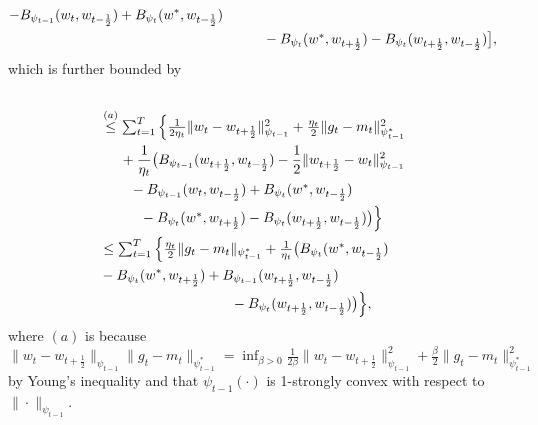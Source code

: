 \documentclass[11pt]{article}
\makeatletter
\renewenvironment{proof}[1][\proofname]{%
   \par\pushQED{\qed}\normalfont%
   \topsep6\p@\@plus6\p@\relax
   \trivlist\item[\hskip\labelsep\bfseries#1]%
   \ignorespaces
}{%
   \popQED\endtrivlist\@endpefalse
}
\theoremstyle{k}
\makeatother
\begin{document}
\begin{proof}
\begin{equation}
\begin{aligned}
- B_{\psi_{t-1}}(w_{t}, w_{t-\frac{1}{2}})
+  B_{\psi_t}( w^*, w_{t-\frac{1}{2}})
\\ &\hspace{0.4in} \textstyle
- B_{\psi_t}(w^*,  w_{t+\frac{1}{2}} )
- B_{\psi_t}(w_{t+\frac{1}{2}}, w_{t-\frac{1}{2}})  \big],
\end{aligned}
\end{equation}
which is further bounded by
\begin{equation} \label{nnnn}
\begin{aligned}
\\ & \textstyle
 \overset{(a)}{\leq} \sum_{t=1}^T \Big\{
\frac{1}{2 \eta_t} \| w_t - w_{t+\frac{1}{2} } \|_{\psi_{t-1}}^2 + \frac{\eta_t}{2} \| g_t - m_t  \|_{\psi_{t-1}^*}^2
 \textstyle
 \\
 &\hspace{0.2in}+ \frac{1}{\eta_t} \big( B_{\psi_{t-1}}( w_{t+\frac{1}{2}}, w_{t-\frac{1}{2}})
- \frac{1}{2} \| w_{t+\frac{1}{2}} - w_t \|_{\psi_{t-1}}^2
 \\
 &\hspace{0.3in}\textstyle
 - B_{\psi_{t-1}}(w_{t}, w_{t-\frac{1}{2}})
 +  B_{\psi_t}( w^*, w_{t-\frac{1}{2}})
 \\
 &\hspace{0.4in}\textstyle
- B_{\psi_t}(w^*,  w_{t+\frac{1}{2}} )
- B_{\psi_t}(w_{t+\frac{1}{2}}, w_{t-\frac{1}{2}})  \big) \Big\}
\\ & \textstyle
 \leq \sum_{t=1}^T \Big\{
\frac{\eta_t}{2} \| g_t - m_t  \|_{\psi_{t-1}^*}
 \textstyle
+ \frac{1}{\eta_t}
\big(B_{\psi_t}( w^*, w_{t-\frac{1}{2}}) \\
&- B_{\psi_t}( w^*, w_{t+\frac{1}{2}})
\textstyle
+ B_{\psi_{t-1}}( w_{t+\frac{1}{2}}, w_{t-\frac{1}{2}})
\\
&\hspace{1.3in} -B_{\psi_t}(w_{t+\frac{1}{2}}, w_{t-\frac{1}{2}})
\big)
\Big\},
\end{aligned}
\end{equation}
where $(a)$ is because
$
\| w_t - w_{t+\frac{1}{2} } \|_{\psi_{t-1}} \| g_t - m_t  \|_{\psi_{t-1}^*} = \inf_{ \beta > 0 }   \frac{1}{2\beta}
\| w_t - w_{t+\frac{1}{2} } \|_{\psi_{t-1}}^2 +
 \frac{\beta}{2} \| g_t - m_t  \|_{\psi_{t-1}^*}^2$ by Young's inequality
and that $\psi_{t-1}(\cdot)$ is 1-strongly convex with respect to $\| \cdot \|_{\psi_{t-1}}$.


\end{proof}
\end{document}
